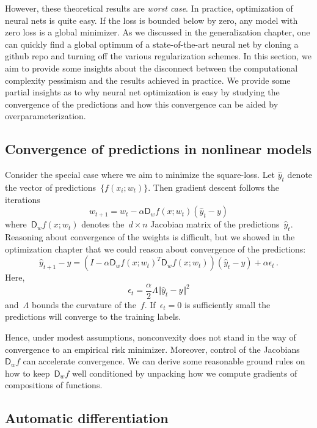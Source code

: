 \documentclass{tufte-book}
\begin{document}
However, these theoretical results are \emph{worst case}. In practice,
optimization of neural nets is quite easy. If the loss is bounded below
by zero, any model with zero loss is a global minimizer. As we discussed
in the generalization chapter, one can quickly find a global optimum of
a state-of-the-art neural net by cloning a github repo and turning off
the various regularization schemes. In this section, we aim to provide
some insights about the disconnect between the computational complexity
pessimism and the results achieved in practice. We provide some partial
insights as to why neural net optimization is easy by studying the
convergence of the predictions and how this convergence can be aided by
overparameterization.

\hypertarget{convergence-of-predictions-in-nonlinear-models}{%
\subsection{Convergence of predictions in nonlinear
models}\label{convergence-of-predictions-in-nonlinear-models}}

Consider the special case where we aim to minimize the square-loss. Let
\(\hat{y}_t\) denote the vector of predictions~\(\{f(x_i;w_t)\}\). Then
gradient descent follows the iterations \[
    w_{t+1} = w_t - \alpha \mathsf{D}_w f(x;w_t) (\hat{y}_t - y)
\] where~\(\mathsf{D}_w f(x;w_t)\) denotes the~\(d\times n\) Jacobian
matrix of the predictions~\(\hat{y}_t\). Reasoning about convergence of
the weights is difficult, but we showed in the optimization chapter that
we could reason about convergence of the predictions: \[
    \hat{y}_{t+1}-y = (I -  \alpha \mathsf{D}_w f(x; w_t)^T \mathsf{D}_w f(x;w_t))(\hat{y}_t - y) + \alpha \epsilon_t\,.
\] Here, \[
    \epsilon_t = \frac{\alpha}{2} \Lambda \Vert \hat{y}_t - y \Vert^2
\] and~\(\Lambda\) bounds the curvature of the~\(f\).
If~\(\epsilon_t=0\) is sufficiently small the predictions will converge
to the training labels.

Hence, under modest assumptions, nonconvexity does not stand in the way
of convergence to an empirical risk minimizer. Moreover, control of the
Jacobians~\(\mathsf{D}_w f\) can accelerate convergence. We can derive
some reasonable ground rules on how to keep~\(\mathsf{D}_w f\) well
conditioned by unpacking how we compute gradients of compositions of
functions.

\hypertarget{automatic-differentiation}{%
\subsection{Automatic differentiation}\label{automatic-differentiation}}
\end{document}
